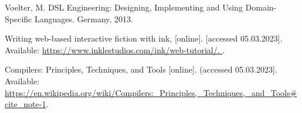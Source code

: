 \begin{thebibliography}{99}
\singlespace \normalsize

  Voelter, M. DSL Engineering: Designing, Implementing and Using Domain-Specific Languages. Germany, 2013.

  Writing web-based interactive fiction with ink, [online]. [accessed 05.03.2023]. Available: 
  \url{https://www.inklestudios.com/ink/web-tutorial/. }.

  Compilers: Principles, Techniques, and Tools [online]. (accessed 05.03.2023]. Available: 
  \url{https://en.wikipedia.org/wiki/Compilers:_Principles,_Techniques,_and_Tools#cite_note-1}.
  
\end{thebibliography}

